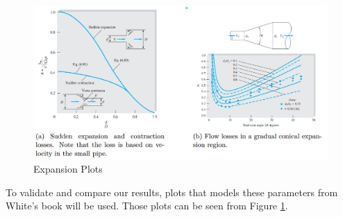 \begin{figure}[H]
  \centering
  \includegraphics[width=.9\linewidth]{images/task3/expansion_figures.png}
  \caption{Expansion Plots \cite{white_chul_2016}}
  \label{fig:exp_plots}
\end{figure}


\noindent To validate and compare our results, plots that models these parameters from White's book \cite{white_chul_2016} will be used. Those plots can be seen from Figure \ref{fig:exp_plots}.